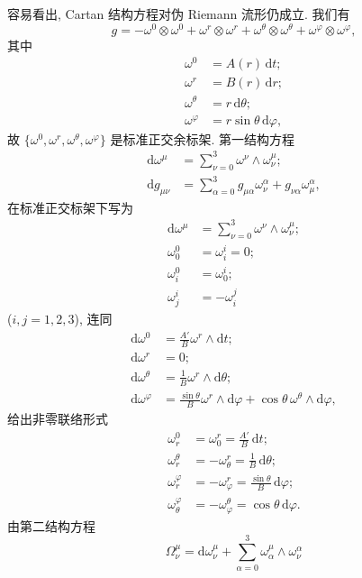 容易看出, Cartan 结构方程对伪 Riemann 流形仍成立. 我们有
\[
  g=-\omega^0\otimes\omega^0+\omega^r\otimes\omega^r
    +\omega^\theta\otimes\omega^\theta+\omega^\varphi\otimes\omega^\varphi,
\]
其中
\begin{align*}
  \omega^0&=A(r)\,\mathrm{d}t;\\
  \omega^r&=B(r)\,\mathrm{d}r;\\
  \omega^\theta&=r\,\mathrm{d}\theta;\\
  \omega^\varphi&=r\sin\theta\,\mathrm{d}\varphi,
\end{align*}
故 $\{\omega^0,\omega^r,\omega^\theta,\omega^\varphi\}$ 是标准正交余标架. 第一结构方程
\begin{align*}
  \mathrm{d}\omega^\mu&=\sum_{\nu=0}^3\omega^\nu\wedge\omega_\nu^\mu;\\
  \mathrm{d}g_{\mu\nu}&=\sum_{\alpha=0}^3g_{\mu\alpha}\omega_\nu^\alpha
       +g_{\nu\alpha}\omega_\mu^\alpha,
\end{align*}
在标准正交标架下写为
\begin{align*}
  \mathrm{d}\omega^\mu&=\sum_{\nu=0}^3\omega^\nu\wedge\omega_\nu^\mu;\\
  \omega_0^0&=\omega_i^i=0;\\
  \omega_i^0&=\omega_0^i;\\
  \omega_j^i&=-\omega_i^j
\end{align*}
($i,j=1,2,3$), 连同
\begin{align*}
  \mathrm{d}\omega^0&=\frac{A'}{B}\omega^r\wedge\mathrm{d}t;\\
  \mathrm{d}\omega^r&=0;\\
  \mathrm{d}\omega^\theta&=\frac{1}{B}\omega^r\wedge\mathrm{d}\theta;\\
  \mathrm{d}\omega^\varphi&=\frac{\sin\theta}{B}\omega^r\wedge\mathrm{d}\varphi
                         +\cos\theta\,\omega^\theta\wedge\mathrm{d}\varphi,
\end{align*}
给出非零联络形式
\begin{align*}
  \omega_r^0&=\omega_0^r=\frac{A'}{B}\,\mathrm{d}t;\\
  \omega_r^\theta&=-\omega_\theta^r=\frac{1}{B}\,\mathrm{d}\theta;\\
  \omega_r^\varphi&=-\omega_\varphi^r=\frac{\sin\theta}{B}\,\mathrm{d}\varphi;\\
  \omega_\theta^\varphi&=-\omega_\varphi^\theta=\cos\theta\,\mathrm{d}\varphi.
\end{align*}
由第二结构方程
\[
  \Omega_\nu^\mu=\mathrm{d}\omega_\nu^\mu+
                \sum_{\alpha=0}^3\omega_\alpha^\mu\wedge\omega_\nu^\alpha
\]
